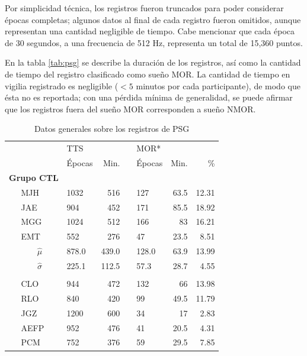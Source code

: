 \documentclass[12pt,letterpaper]{book}
\newcommand{\pz}{\phantom{.0}}
\newcommand{\ppu}{\phantom{1}}
\newcommand{\bordes}[1]{\renewcommand{\arraystretch}{#1}}
\newcommand{\midrulec}{%
  \arrayrulecolor{gris}\specialrule{\aboverulesep}{0pt}{0pt}
  \arrayrulecolor{black}\specialrule{\lightrulewidth}{0pt}{\belowrulesep}
}
\begin{document}
Por simplicidad técnica, los registros fueron truncados para poder considerar épocas completas; algunos datos al final de cada registro fueron omitidos, aunque representan una cantidad negligible de tiempo.
%
Cabe mencionar que cada época de 30 segundos, a una frecuencia de 512 Hz, representa un total de 15,360 puntos.

En la tabla \ref{tab:psg} se describe la duración de los registros, así como la cantidad de tiempo del registro clasificado como sueño MOR.
%
La cantidad de tiempo en vigilia registrado es negligible ($<5$ minutos por cada participante), de modo que ésta no es reportada; con una pérdida mínima de generalidad, se puede afirmar que los registros fuera del sueño MOR corresponden a sueño NMOR.

\begin{table}
\centering
\caption{Datos generales sobre los registros de PSG}
\bordes{1.2}
\begin{tabular}{lllrclrr}
\toprule
    \phantom{mmm}&
    & \multicolumn{2}{l}{TTS} & \phantom{l}   & \multicolumn{3}{l}{MOR*}\\
    \cmidrule{3-4}  \cmidrule{6-8}
    &          &Épocas  &  Min.   &&Épocas  &  Min.   &  \% \\
\midrule
\multicolumn{2}{l}{\textbf{Grupo CTL}}\\
&MJH &    1032   &  516\pz && 127    & 63.5  &12.31 \\
&JAE &\ppu 904   &  452\pz && 171    & 85.5  &18.92 \\
&MGG &    1024   &  512\pz && 166    & 83\pz &16.21 \\
&EMT &\ppu 552   &  276\pz &&  47    & 23.5  & 8.51 \\
 
\rowcolor{gris}
&\multicolumn{1}{c}{$\widehat{\mu}$}  
     &\ppu 878.0 &  439.0  && 128.0  & 63.9  &13.99 \\
\rowcolor{gris}
&\multicolumn{1}{c}{$\widehat{\sigma}$} 
     &\ppu 225.1 &  112.5  &&  57.3  & 28.7  &4.55 \\ 
\midrulec

\multicolumn{2}{l}{\textbf{Grupo PDC}}\\
&CLO  &\ppu 944   & 472\pz && 132\pz & 66\pz & 13.98 \\
&RLO  &\ppu 840   & 420\pz &&  99\pz & 49.5  & 11.79 \\
&JGZ  &    1200   & 600\pz &&  34\pz & 17\pz &  2.83 \\
&AEFP &\ppu 952   & 476\pz &&  41\pz & 20.5  &  4.31 \\
&PCM  &\ppu 752   & 376\pz &&  59\pz & 29.5  &  7.85 \\
 

\end{tabular}
\end{table}
\end{document}
